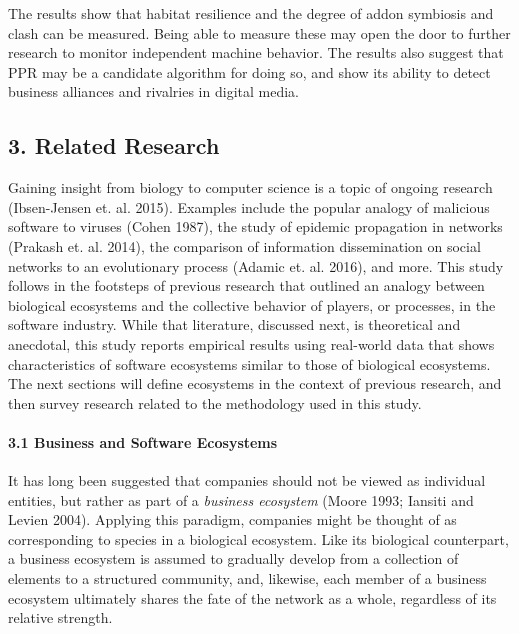 \documentclass{article} %
\begin{document}
The results show that habitat resilience and the degree of addon symbiosis and clash can be measured. Being able to measure these may open the door to further research to monitor independent machine behavior. The results also suggest that PPR may be a candidate algorithm for doing so, and show its ability to detect business alliances and rivalries in digital media. 






\subsection{3.  Related Research}

 

Gaining insight from biology to computer science is a topic of ongoing research (Ibsen-Jensen et. al. 2015). Examples include the popular analogy of malicious software to viruses (Cohen 1987), the study of epidemic propagation in networks (Prakash et. al. 2014), the comparison of information dissemination on social networks to an evolutionary process (Adamic et. al. 2016), and more. This study follows in the footsteps of previous research that outlined an analogy between biological ecosystems and the collective behavior of players, or processes, in the software industry. While that literature, discussed next, is theoretical and anecdotal, this study reports empirical results using real-world data that shows characteristics of software ecosystems similar to those of biological ecosystems. The next sections will define ecosystems in the context of previous research, and then survey research related to the methodology used in this study.




\paragraph{3.1  Business and Software Ecosystems}

 

It has long been suggested that companies should not be viewed as individual entities, but rather as part of a \textit{business ecosystem} (Moore 1993; Iansiti and Levien 2004). Applying this paradigm, companies might be thought of as corresponding to species in a biological ecosystem. Like its biological counterpart, a business ecosystem is assumed to gradually develop from a collection of elements to a structured community, and, likewise, each member of a business ecosystem ultimately shares the fate of the network as a whole, regardless of its relative strength. 
\end{document}
